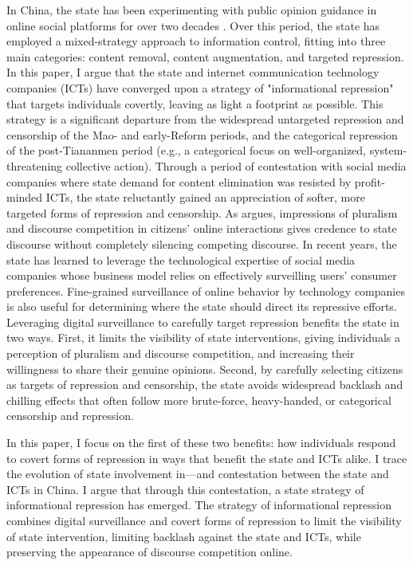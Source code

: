 \documentclass[11pt]{article}
\begin{document}
In China, the state has been experimenting with public opinion guidance in online social platforms for over two decades \citep{wei2015gongan,zou2015wangluo,xie2011zhongguo,xie2018zhongguo}. Over this period, the state has employed a mixed-strategy approach to information control, fitting into three main categories: content removal, content augmentation, and targeted repression. In this paper, I argue that the state and internet communication technology companies (ICTs) have converged upon a strategy of "informational repression" that targets individuals covertly, leaving as light a footprint as possible. This strategy is a significant departure from the widespread untargeted repression and censorship of the Mao- and early-Reform periods, and the categorical repression of the post-Tiananmen period (e.g., a categorical focus on well-organized, system-threatening collective action). Through a period of contestation with social media companies where state demand for content elimination was resisted by profit-minded ICTs, the state reluctantly gained an appreciation of softer, more targeted forms of repression and censorship. As \citep{han2018contesting} argues, impressions of pluralism and discourse competition in citizens' online interactions gives credence to state discourse without completely silencing competing discourse. In recent years, the state has learned to leverage the technological expertise of social media companies whose business model relies on effectively surveilling users' consumer preferences. Fine-grained surveillance of online behavior by technology companies is also useful for determining where the state should direct its repressive efforts. Leveraging digital surveillance to carefully target repression benefits the state in two ways. First, it limits the visibility of state interventions, giving individuals a perception of pluralism and discourse competition, and increasing their willingness to share their genuine opinions. Second, by carefully selecting citizens as targets of repression and censorship, the state avoids widespread backlash and chilling effects that often follow more brute-force, heavy-handed, or categorical censorship and repression.

In this paper, I focus on the first of these two benefits: how individuals respond to covert forms of repression in ways that benefit the state and ICTs alike. I trace the evolution of state involvement in—and contestation between the state and ICTs in China. I argue that through this contestation, a state strategy of informational repression has emerged. The strategy of informational repression combines digital surveillance and covert forms of repression to limit the visibility of state intervention, limiting backlash against the state and ICTs, while preserving the appearance of discourse competition online.
\end{document}
